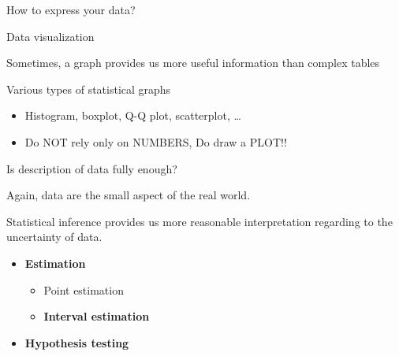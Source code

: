 \documentclass[9pt,ignorenonframetext,xcolor=dvipsnames]{beamer}
\providecommand{\tightlist}{%
  \setlength{\itemsep}{0pt}\setlength{\parskip}{0pt}}
\newlength{\wideitemsep}
\let\olditem\item
\renewcommand{\item}{\setlength{\itemsep}{\wideitemsep}\olditem}
\begin{document}
\begin{frame}{How to express your data?}

\begin{block}{Data visualization}

\begin{mdframed}[backgroundcolor = gray!30]
Sometimes, a graph provides us more useful information than complex tables
\end{mdframed}

\end{block}

\begin{block}{Various types of statistical graphs}

\begin{itemize}
\tightlist
\item
  Histogram, boxplot, Q-Q plot, scatterplot, \ldots{}
\item
  Do NOT rely only on NUMBERS, Do draw a PLOT!!
\end{itemize}

\end{block}

\end{frame}

\begin{frame}{Is description of data fully enough?}

Again, data are the small aspect of the real world.

Statistical inference provides us more reasonable interpretation
regarding to the uncertainty of data.

\begin{tcolorbox}[colback=gray!10,colframe=black, title=\textbf{Two main aspects of statistical inference}]
\begin{itemize}
\tightlist
  \item \textbf{Estimation}
  \begin{itemize}
  \tightlist
    \item Point estimation
    \item \textbf{Interval estimation}
  \end{itemize}
  \item \textbf{Hypothesis testing}
\end{itemize}
\end{tcolorbox}

\end{frame}
\end{document}
